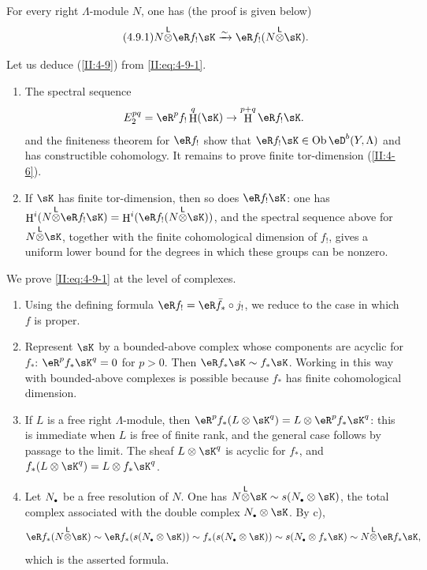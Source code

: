 \documentclass[12pt,oneside,english]{smfbook}
\DeclareMathOperator{\h}{H}
\DeclareMathOperator{\ob}{Ob}
\newcommand{\iso}{\xrightarrow\sim}
\newcommand{\lotimes}{{\overset{\mathsf{L}}{\otimes}}}
\let\oldbullet\bullet
\renewcommand{\bullet}{\textnormal{\tiny$\oldbullet$}}
\begin{document}
For every right $\Lambda$-module $N$, one has (the proof is given below)
\begin{equation*}\tag{4.9.1}\label{II:eq:4-9-1}
  N\lotimes \eR f_! \sK \iso \eR f_! (N\lotimes \sK) \text{.}
\end{equation*}

Let us deduce (\ref{II:4-9}) from \eqref{II:eq:4-9-1}.
\begin{enumerate}[\indent a)]
  \item The spectral sequence
    \[
      E_2^{p q} = \eR^p f_! \h^q(\sK) \rightarrow \h^{p+q} \eR f_! \sK \text{.}
    \]
    and the finiteness theorem for $\eR f_!$ show that $\eR f_!\sK\in\ob\eD^b(Y,\Lambda)$ and has constructible cohomology. It remains to prove finite tor-dimension (\ref{II:4-6}).
  \item If $\sK$ has finite tor-dimension, then so does $\eR f_!\sK$: one has $\h^i(N\lotimes\eR f_!\sK)=\h^i(\eR f_!(N\lotimes\sK))$, and the spectral sequence above for $N\lotimes\sK$, together with the finite cohomological dimension of $f_!$, gives a uniform lower bound for the degrees in which these groups can be nonzero.
\end{enumerate}

We prove \eqref{II:eq:4-9-1} at the level of complexes.
\begin{enumerate}[\indent a)]
  \item Using the defining formula $\eR f_!=\eR\bar f_*\circ j_!$, we reduce to the case in which $f$ is proper.
  \item Represent $\sK$ by a bounded-above complex whose components are acyclic for $f_*$: $\eR^pf_*\sK^q=0$ for $p>0$. Then $\eR f_*\sK\sim f_*\sK$. Working in this way with bounded-above complexes is possible because $f_*$ has finite cohomological dimension.
  \item If $L$ is a free right $\Lambda$-module, then $\eR^pf_*(L\otimes\sK^q)=L\otimes\eR^pf_*\sK^q$: this is immediate when $L$ is free of finite rank, and the general case follows by passage to the limit. The sheaf $L\otimes\sK^q$ is acyclic for $f_*$, and $f_*(L\otimes\sK^q)=L\otimes f_*\sK^q$.
  \item Let $N_\bullet$ be a free resolution of $N$. One has $N\lotimes\sK\sim s(N_\bullet\otimes\sK)$, the total complex associated with the double complex $N_\bullet\otimes\sK$. By c),
    \[
      \eR f_*(N\lotimes \sK) \sim \eR f_* (s(N_\bullet\otimes \sK)) \sim f_*(s(N_\bullet\otimes \sK)) \sim s(N_\bullet\otimes f_* \sK) \sim N\lotimes \eR f_* \sK \text{,}
    \]
    which is the asserted formula.
\end{enumerate}
\end{document}
